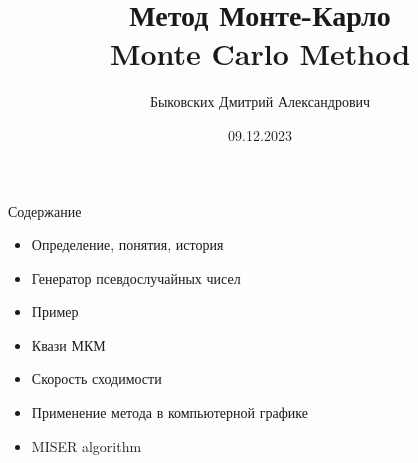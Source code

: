 \documentclass{beamer}
\title[ММК]{Метод Монте-Карло \\ Monte Carlo Method}
\author[Быковских Д.А.]{Быковских Дмитрий Александрович}
\date{09.12.2023}
\begin{document}
	\begin{frame}
		\titlepage
	\end{frame}
	\begin{frame}{Содержание}
		\begin{itemize}
			\item 
			Определение, понятия, история
			\item
			Генератор псевдослучайных чисел
			\item
			Пример
			\item
			Квази МКМ
			\item 
			Скорость сходимости
			\item 
			Применение метода в компьютерной графике
			\item
			MISER algorithm
		\end{itemize}

		\note{
					
					
			
		}
	\end{frame}
\end{document}
